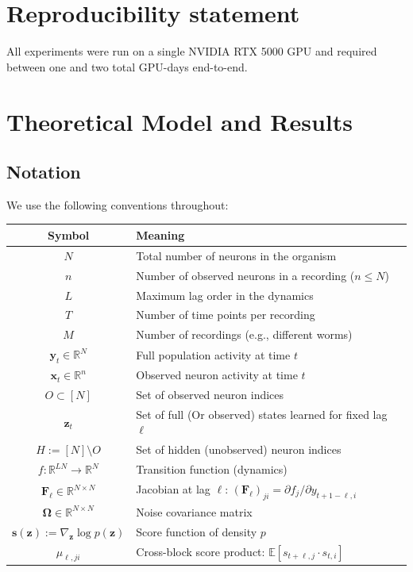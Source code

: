 \documentclass{article}
\theoremstyle{plain}
\theoremstyle{definition}
\theoremstyle{remark}
\newcommand{\R}{\mathbb{R}}
\newcommand{\1}{\mathbf{1}}
\newcommand{\x}{\bm{x}}
\newcommand{\y}{\bm{y}}
\newcommand{\z}{\bm{z}}
\begin{document}



\appendix

\section{Reproducibility statement}
\label{app:reproducibility}

All experiments were run on a single NVIDIA RTX 5000 GPU and required between one and two total GPU-days end-to-end.

\section{Theoretical Model and Results}
\label{app:model}

\subsection{Notation}
We use the following conventions throughout:

\begin{center}
\begin{tabular}{cl}
\toprule
\textbf{Symbol} & \textbf{Meaning} \\
\midrule
$N$ & Total number of neurons in the organism \\
$n$ & Number of observed neurons in a recording ($n \leq N$) \\
$L$ & Maximum lag order in the dynamics \\
$T$ & Number of time points per recording \\
$M$ & Number of recordings (e.g., different worms) \\
$\y_t \in \R^N$ & Full population activity at time $t$ \\
$\x_t \in \R^n$ & Observed neuron activity at time $t$ \\
$O \subset [N]$ & Set of observed neuron indices \\
$\z_t$ & Set of full (Or observed) states learned for fixed lag $\ell$ \\
$H := [N] \setminus O$ & Set of hidden (unobserved) neuron indices \\
$f: \R^{LN} \to \R^N$ & Transition function (dynamics) \\
$\bm{F}_\ell \in \R^{N \times N}$ & Jacobian at lag $\ell$: $(\bm{F}_\ell)_{ji} = \partial f_j / \partial y_{t+1-\ell,i}$ \\
$\bm{\Omega} \in \R^{N \times N}$ & Noise covariance matrix \\
$\bm{s}(\bm{z}) := \nabla_{\bm{z}} \log p(\bm{z})$ & Score function of density $p$ \\
$\mu_{\ell,ji}$ & Cross-block score product: $\mathbb{E}[s_{t+\ell,j} \cdot s_{t,i}]$ \\
\bottomrule
\end{tabular}
\end{center}
\end{document}
